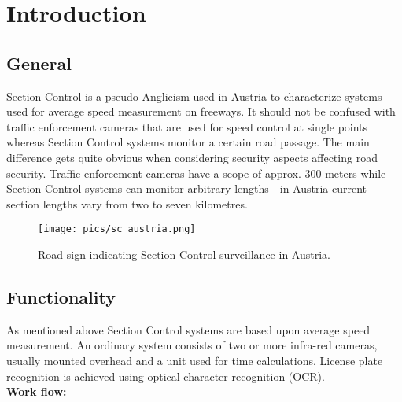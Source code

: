 \documentclass[oneside,bachelor,etd]{BYUPhys}
\begin{document}
 \frontmatter

 \makepreliminarypages

 \singlespace

 \tableofcontents
 \clearemptydoublepage

 \listoffigures
 \clearemptydoublepage

 \doublespace

 \mainmatter


\chapter{Introduction}

\section{General}
\label{sec:1general}

Section Control is a pseudo-Anglicism used in Austria to characterize systems used for average speed measurement on freeways. 
It should not be confused with traffic enforcement cameras that are used for speed control at single points whereas 
Section Control systems monitor a certain road passage. The main difference gets quite obvious when considering security aspects
affecting road security. Traffic enforcement cameras have a scope of approx. 300 meters while 
Section Control systems can monitor arbitrary lengths - in Austria current section lengths vary from two to seven kilometres.

\begin{figure}
    \centerline{\texttt{[image: pics/sc\_austria.png]}}
    \caption[Section Control indicator]{\label{fig:Section Control indicator}
	Road sign indicating Section Control surveillance in Austria.}
\end{figure}


\section{Functionality}
\label{sec:1functionality}

As mentioned above Section Control systems are based upon average speed measurement. 
An ordinary system consists of two or more infra-red cameras, usually mounted overhead 
and a unit used for time calculations. License plate recognition is achieved using optical character recognition (OCR). \\
\textbf{Work flow:}
\end{document}
